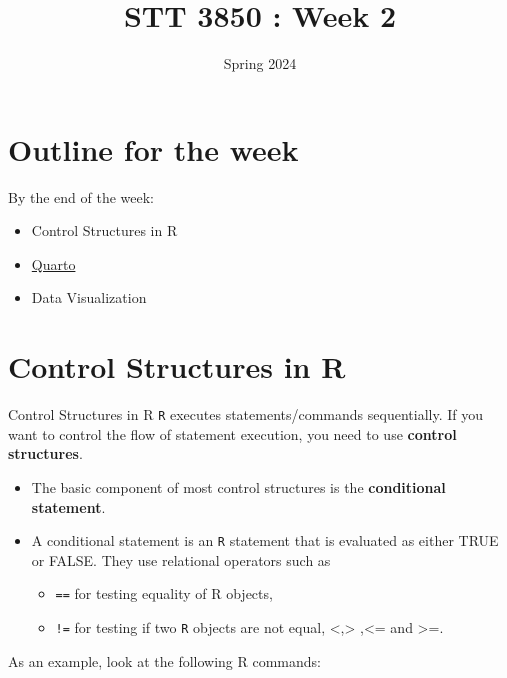 \documentclass[
  ignorenonframetext,
]{beamer}
\title{STT 3850 : Week 2}
\author{Spring 2024}
\date{}
\institute{Appalachian State University}
\providecommand{\tightlist}{%
  \setlength{\itemsep}{0pt}\setlength{\parskip}{0pt}}
\begin{document}
\frame{\titlepage}

\hypertarget{outline-for-the-week}{%
\section{Outline for the week}\label{outline-for-the-week}}

\begin{frame}{By the end of the week:}
\protect\hypertarget{by-the-end-of-the-week}{}
\begin{itemize}
\tightlist
\item
  Control Structures in R
\item
  \href{https://quarto.org/}{Quarto}
\item
  Data Visualization
\end{itemize}
\end{frame}

\hypertarget{control-structures-in-r}{%
\section{Control Structures in R}\label{control-structures-in-r}}

\begin{frame}[fragile]{Control Structures in R}
\protect\hypertarget{control-structures-in-r-1}{}
\texttt{R} executes statements/commands sequentially. If you want to
control the flow of statement execution, you need to use \textbf{control
structures}.

\begin{itemize}
\item
  The basic component of most control structures is the
  \textbf{conditional statement}.
\item
  A conditional statement is an \texttt{R} statement that is evaluated
  as either TRUE or FALSE. They use relational operators such as

  \begin{itemize}
  \item
    \texttt{==} for testing equality of R objects,
  \item
    \texttt{!=} for testing if two \texttt{R} objects are not equal,
    \textless,\textgreater{} ,\textless= and \textgreater=.
  \end{itemize}
\end{itemize}

As an example, look at the following R commands:
\end{frame}
\end{document}
